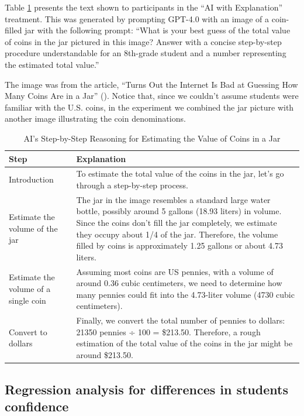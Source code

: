 \documentclass[
  11pt,
]{article}
\begin{document}
Table \ref{tab:explanation} presents the text shown to participants in the ``AI with Explanation'' treatment. This was generated by prompting GPT-4.0 with an image of a coin-filled jar with the following prompt: ``What is your best guess of the total value of coins in the jar pictured in this image? Answer with a concise step-by-step procedure understandable for an 8th-grade student and a number representing the estimated total value.''

The image was from the article, ``Turns Out the Internet Is Bad at Guessing How Many Coins Are in a Jar'' (). Notice that, since we couldn't assume students were familiar with the U.S. coins, in the experiment we combined the jar picture with another image illustrating the coin denominations.

\begin{table}

\caption{\label{tab:explanation}AI's Step-by-Step Reasoning for Estimating the Value of Coins in a Jar}
\centering
\begin{tabular}[t]{l>{\raggedright\arraybackslash}p{4in}}
\toprule
Step & Explanation\\
\midrule
Introduction & To estimate the total value of the coins in the jar, let's go through a step-by-step process.\\
Estimate the volume of the jar & The jar in the image resembles a standard large water bottle, possibly around 5 gallons (18.93 liters) in volume. Since the coins don't fill the jar completely, we estimate they occupy about 1/4 of the jar. Therefore, the volume filled by coins is approximately 1.25 gallons or about 4.73 liters.\\
Estimate the volume of a single coin & Assuming most coins are US pennies, with a volume of around 0.36 cubic centimeters, we need to determine how many pennies could fit into the 4.73-liter volume (4730 cubic centimeters).\\
Convert to dollars & Finally, we convert the total number of pennies to dollars: 21350 pennies ÷ 100 = \$213.50. Therefore, a rough estimation of the total value of the coins in the jar might be around \$213.50.\\
\bottomrule
\end{tabular}
\end{table}
\newpage

\subsection{Regression analysis for differences in students confidence}\label{sec:regress-confidence}
\end{document}
